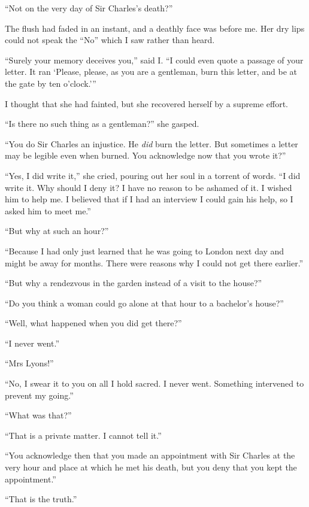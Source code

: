 \documentclass[paper=a5,BCOR=7mm,twoside,DIV=calc,12pt,usegeometry,openany,chapterprefix,endperiod,headings=big]{scrbook} %
\begin{document}
\enquote{Not on the very day of Sir Charles's death?}

The flush had faded in an instant, and a deathly face was before me. Her dry lips could not speak the \enquote{No} which I saw rather than heard.

\enquote{Surely your memory deceives you,} said I. \enquote{I could even quote a passage of your letter. It ran \enquote{Please, please, as you are a gentleman, burn this letter, and be at the gate by ten o'clock.}}

I thought that she had fainted, but she recovered herself by a supreme effort.

\enquote{Is there no such thing as a gentleman?} she gasped.

\enquote{You do Sir Charles an injustice. He \emph{did} burn the letter. But sometimes a letter may be legible even when burned. You acknowledge now that you wrote it?}

\enquote{Yes, I did write it,} she cried, pouring out her soul in a torrent of words. \enquote{I did write it. Why should I deny it? I have no reason to be ashamed of it. I wished him to help me. I believed that if I had an interview I could gain his help, so I asked him to meet me.}

\enquote{But why at such an hour?}

\enquote{Because I had only just learned that he was going to London next day and might be away for months. There were reasons why I could not get there earlier.}

\enquote{But why a rendezvous in the garden instead of a visit to the house?}

\enquote{Do you think a woman could go alone at that hour to a bachelor's house?}

\enquote{Well, what happened when you did get there?}

\enquote{I never went.}

\enquote{Mrs Lyons!}

\enquote{No, I swear it to you on all I hold sacred. I never went. Something intervened to prevent my going.}

\enquote{What was that?}

\enquote{That is a private matter. I cannot tell it.}

\enquote{You acknowledge then that you made an appointment with Sir Charles at the very hour and place at which he met his death, but you deny that you kept the appointment.}

\enquote{That is the truth.}
\end{document}
